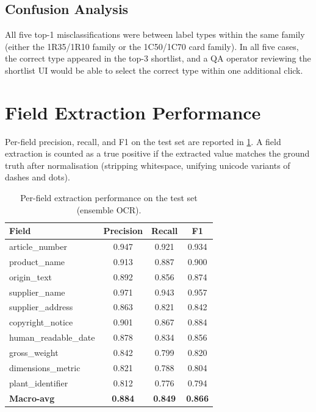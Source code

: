 \subsection{Confusion Analysis}

All five top-1 misclassifications were between label types within the same family (either
the 1R35/1R10 family or the 1C50/1C70 card family). In all five cases, the correct type
appeared in the top-3 shortlist, and a QA operator reviewing the shortlist UI would be
able to select the correct type within one additional click.

\section{Field Extraction Performance}

Per-field precision, recall, and F1 on the test set are reported in \cref{tab:field_f1}.
A field extraction is counted as a true positive if the extracted value matches the ground
truth after normalisation (stripping whitespace, unifying unicode variants of dashes and
dots).

\begin{table}[h]
\centering
\caption{Per-field extraction performance on the test set (ensemble OCR).}
\label{tab:field_f1}
\begin{tabular}{lccc}
\toprule
\textbf{Field} & \textbf{Precision} & \textbf{Recall} & \textbf{F1} \\
\midrule
article\_number         & 0.947 & 0.921 & 0.934 \\
product\_name           & 0.913 & 0.887 & 0.900 \\
origin\_text            & 0.892 & 0.856 & 0.874 \\
supplier\_name          & 0.971 & 0.943 & 0.957 \\
supplier\_address       & 0.863 & 0.821 & 0.842 \\
copyright\_notice       & 0.901 & 0.867 & 0.884 \\
human\_readable\_date   & 0.878 & 0.834 & 0.856 \\
gross\_weight           & 0.842 & 0.799 & 0.820 \\
dimensions\_metric      & 0.821 & 0.788 & 0.804 \\
plant\_identifier       & 0.812 & 0.776 & 0.794 \\
\midrule
\textbf{Macro-avg}      & \textbf{0.884} & \textbf{0.849} & \textbf{0.866} \\
\bottomrule
\end{tabular}
\end{table}

